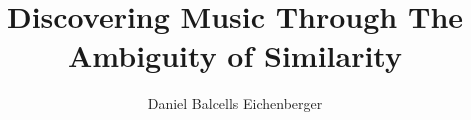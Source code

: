 \title{Discovering Music Through The Ambiguity of Similarity}
\author{Daniel Balcells Eichenberger}

\usepackage[latin1]{inputenc}
\usepackage{setspace}

\usepackage[english]{babel}

\usepackage[cam,a4,center,frame]{crop}

\usepackage{graphicx}

\usepackage{charter} %

\usepackage[
  bibstyle=authoryear-comp,
  citestyle=0-Misc/authoryearbrack,
  maxnames=1,
  hyperref=true,
  backref=true,
  backrefstyle=none,
  backend=bibtex,
  idemtracker=true
]{biblatex}

\usepackage[colorlinks=false]{hyperref}
\hypersetup{
    colorlinks,
    citecolor=black,
    filecolor=black,
    linkcolor=black,
    urlcolor=black
}


\pagestyle{plain}

\usepackage{makeidx}
\makeindex

\usepackage{fancyhdr}
\pagestyle{fancy}
\fancyfoot{}
\fancyfoot[RO]{\thepage}
\fancyfoot[LE]{\thepage}

\renewcommand{\thetable}{\arabic{section}.\arabic{table}}
\renewcommand{\thefigure}{\arabic{section}.\arabic{figure}}

\usepackage[toc,page]{appendix}